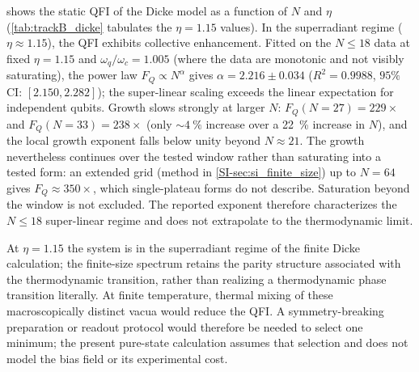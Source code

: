 \documentclass[aps,prxquantum,preprint,superscriptaddress,amsmath,amssymb]{revtex4-2}
\begin{document}
 shows the static QFI of the Dicke model as a function of $N$ and $\eta$ (\cref{tab:trackB_dicke} tabulates the $\eta=\num{1.15}$ values). In the superradiant regime ($\eta \approx \num{1.15}$), the QFI exhibits collective enhancement. Fitted on the $N\le\num{18}$ data at fixed $\eta=\num{1.15}$ and $\omega_q/\omega_c=\num{1.005}$ (where the data are monotonic and not visibly saturating), the power law $F_Q \propto N^\alpha$ gives $\alpha = \num{2.216}\pm\num{0.034}$ ($R^2=\num{0.9988}$, $95\%$ CI: $[\num{2.150}, \num{2.282}]$); the super-linear scaling exceeds the linear expectation for independent qubits. Growth slows strongly at larger $N$: $F_Q(N=\num{27})=\num{229}\times$ and $F_Q(N=\num{33})=\num{238}\times$ (only $\sim\qty{4}{\percent}$ increase over a \qty{22}{\percent} increase in $N$), and the local growth exponent falls below unity beyond $N\approx\num{21}$. The growth nevertheless continues over the tested window rather than saturating into a tested form: an extended grid (method in \cref{SI-sec:si_finite_size}) up to $N=\num{64}$ gives $F_Q\approx\num{350}\times$, which single-plateau forms do not describe. Saturation beyond the window is not excluded. The reported exponent therefore characterizes the $N\le\num{18}$ super-linear regime and does not extrapolate to the thermodynamic limit.

At $\eta = \num{1.15}$ the system is in the superradiant regime of the finite Dicke calculation; the finite-size spectrum retains the parity structure associated with the thermodynamic transition, rather than realizing a thermodynamic phase transition literally. At finite temperature, thermal mixing of these macroscopically distinct vacua would reduce the QFI. A symmetry-breaking preparation or readout protocol would therefore be needed to select one minimum; the present pure-state calculation assumes that selection and does not model the bias field or its experimental cost.
\end{document}
